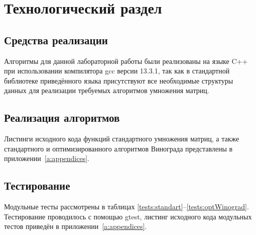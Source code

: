 \chapter{Технологический раздел}
\section{Средства реализации}
Алгоритмы для данной лабораторной работы были реализованы на языке C++ при использовании компилятора gcc версии 13.3.1, так как в стандартной библиотеке приведённого языка присутствуют все необходимые структуры данных для реализации требуемых алгоритмов умножения матриц.

\section{Реализация алгоритмов}
Листинги исходного кода функций стандартного умножения матриц, а также стандартного и оптимизированного алгоритмов Винограда представлены в приложении~\ref{a:appendices}.

\section{Тестирование}

Модульные тесты рассмотрены в таблицах \ref{tests:standart}--\ref{tests:optWinograd}. Тестирование проводилось с помощью gtest, листинг исходного кода модульных тестов приведён в приложении~\ref{a:appendices}.


